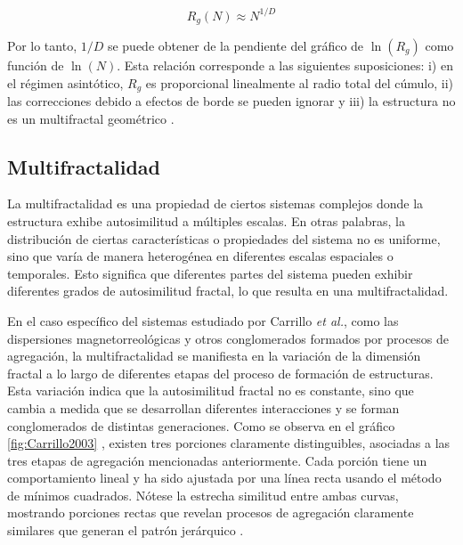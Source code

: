 \documentclass[11pt]{article}
\begin{document}
\begin{equation}
R_g(N) \approx N^{1/D}
\end{equation}

Por lo tanto, \(1/D\) se puede obtener de la pendiente del gr\'{a}fico de \(\ln(R_g)\) como funci\'{o}n de \(\ln(N)\). Esta relaci\'{o}n corresponde a las siguientes suposiciones: i) en el r\'{e}gimen asint\'{o}tico, \(R_g\) es proporcional linealmente al radio total del c\'{u}mulo, ii) las correcciones debido a efectos de borde se pueden ignorar y iii) la estructura no es un multifractal geom\'{e}trico \cite{Mroczka2012, Vicsek1992}.

\subsection{Multifractalidad}

La multifractalidad es una propiedad de ciertos sistemas complejos donde la estructura exhibe autosimilitud a m\'{u}ltiples escalas. En otras palabras, la distribuci\'{o}n de ciertas caracter\'{i}sticas o propiedades del sistema no es uniforme, sino que var\'{i}a de manera heterog\'{e}nea en diferentes escalas espaciales o temporales. Esto significa que diferentes partes del sistema pueden exhibir diferentes grados de autosimilitud fractal, lo que resulta en una multifractalidad.

En el caso espec\'{i}fico del sistemas estudiado por  Carrillo \textit{et al.}\cite{Carrillo2003}, como las dispersiones magnetorreol\'{o}gicas y otros conglomerados formados por procesos de agregaci\'{o}n, la multifractalidad se manifiesta en la variaci\'{o}n de la dimensi\'{o}n fractal a lo largo de diferentes etapas del proceso de formaci\'{o}n de estructuras. Esta variaci\'{o}n indica que la autosimilitud fractal no es constante, sino que cambia a medida que se desarrollan diferentes interacciones y se forman conglomerados de distintas generaciones. Como se observa en el gr\'{a}fico \ref{fig:Carrillo2003} , existen tres porciones claramente distinguibles, asociadas a las tres etapas de agregaci\'{o}n mencionadas anteriormente. Cada porci\'{o}n tiene un comportamiento lineal y ha sido ajustada por una l\'{i}nea recta usando el m\'{e}todo de m\'{i}nimos cuadrados. N\'{o}tese la estrecha similitud entre ambas curvas, mostrando porciones rectas que revelan procesos de agregaci\'{o}n claramente similares que generan el patr\'{o}n jer\'{a}rquico \cite{Carrillo2003}.
\end{document}
